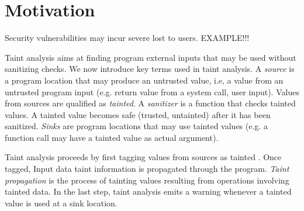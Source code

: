 \section{Motivation}

Security vulnerabilities may incur severe lost to users.
EXAMPLE!!!

Taint analysis aims at finding program external inputs
that may be used without sanitizing checks.
We now introduce key terms used in taint analysis.
A \textit{source} is a program location that may produce
an untrusted value, i.e, a value from an untrusted program
input (e.g. return value from a system call, user input). 
Values from sources are qualified as \textit{tainted}.
A \textit{sanitizer} is a function that checks tainted
values. A tainted value becomes safe (trusted, untainted)
after it has been sanitized.
\textit{Sinks} are program locations that may use tainted
values (e.g. a function call may have a tainted value as
actual argument).

Taint analysis proceeds by first tagging values from sources
as tainted . Once tagged, Input data taint information is
propagated through the program.
\textit{Taint propagation} is the process of tainting values
resulting from operations involving tainted data. In the
last step, taint analysis emits a warning whenever a tainted
value is used at a sink location.